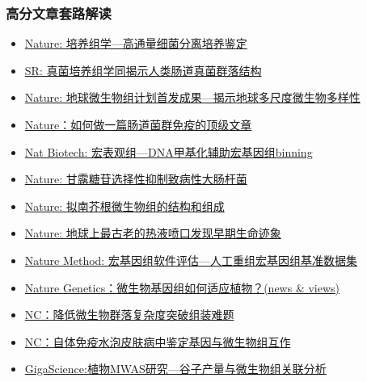 \documentclass[]{article}
\providecommand{\tightlist}{%
  \setlength{\itemsep}{0pt}\setlength{\parskip}{0pt}}
\numberwithin{figure}{section}
\numberwithin{table}{section}
\begin{document}
\hypertarget{ux9ad8ux5206ux6587ux7ae0ux5957ux8defux89e3ux8bfb}{%
\subsubsection{高分文章套路解读}\label{ux9ad8ux5206ux6587ux7ae0ux5957ux8defux89e3ux8bfb}}

\begin{itemize}
\tightlist
\item
  \href{http://mp.weixin.qq.com/s/_xaxicmV5cyKfnYoKHQQbg}{Nature: 培养组学---高通量细菌分离培养鉴定}
\item
  \href{https://mp.weixin.qq.com/s/_DjxjlXH3URKpZN50zPqWQ}{SR: 真菌培养组学同揭示人类肠道真菌群落结构}
\item
  \href{http://mp.weixin.qq.com/s/q9Tqbd8VITkYtZIFbByLtg}{Nature: 地球微生物组计划首发成果---揭示地球多尺度微生物多样性}
\item
  \href{http://mp.weixin.qq.com/s/tiBLevKw9HNAW9I0A_Of8A}{Nature：如何做一篇肠道菌群免疫的顶级文章}
\item
  \href{http://mp.weixin.qq.com/s/j9HolFL4bqbjcLHrp4OJAA}{Nat Biotech: 宏表观组---DNA甲基化辅助宏基因组binning}
\item
  \href{http://mp.weixin.qq.com/s/45L9UNx7eqkMxFbckoTEYQ}{Nature: 甘露糖苷选择性抑制致病性大肠杆菌}\\
\item
  \href{http://mp.weixin.qq.com/s/OlFgv-ttRnFdIGXxYjoisw}{Nature: 拟南芥根微生物组的结构和组成}\\
\item
  \href{http://mp.weixin.qq.com/s/uth0BFcvAePl4dSGzv-psQ}{Nature: 地球上最古老的热液喷口发现早期生命迹象}
\item
  \href{http://mp.weixin.qq.com/s/kDYiFfJ8egosETwLpKCFLQ}{Nature Method: 宏基因组软件评估---人工重组宏基因组基准数据集}\\
\item
  \href{http://mp.weixin.qq.com/s/rYyeVFp_ss9lITCytc9LUw}{Nature Genetics：微生物基因组如何适应植物？(news \& views)}
\item
  \href{http://mp.weixin.qq.com/s/K8PwcuyWs3gnUEGwYEMceA}{NC：降低微生物群落复杂度突破组装难题}\\
\item
  \href{https://mp.weixin.qq.com/s/kZ-_TsNcsrLJPaxqUex0Cg}{NC：自体免疫水泡皮肤病中鉴定基因与微生物组互作}\\
\item
  \href{http://mp.weixin.qq.com/s/TNCos80soqLAbhxHptRUhA}{GigaScience:植物MWAS研究---谷子产量与微生物组关联分析}\\

\end{itemize}
\end{document}
